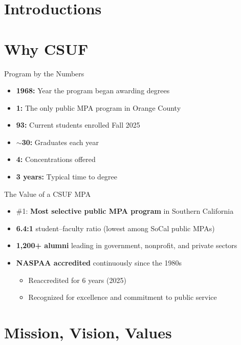 \documentclass[10pt]{beamer}
\begin{document}
\section{\textcolor{titanorange}{Introductions}}

\section{\textcolor{titanorange}{Why CSUF}}
\begin{frame}{Program by the Numbers}
\begin{Large}
\begin{itemize}
  \item \textbf{1968:} Year the program began awarding degrees
  \item \textbf{1:} The only public MPA program in Orange County
  \item \textbf{93:} Current students enrolled Fall 2025
  \item \textbf{\(\sim\)30:} Graduates each year
  \item \textbf{4:} Concentrations offered
  \item \textbf{3 years:} Typical time to degree
\end{itemize}
\end{Large}
\end{frame}

\begin{frame}{The Value of a CSUF MPA}
\begin{Large}
\begin{itemize}
  \item \#1: \textbf{Most selective public MPA program} in Southern California
  \item \textbf{6.4:1} student--faculty ratio (lowest among SoCal public MPAs)
  \item \textbf{1,200+ alumni} leading in government, nonprofit, and private sectors
  \item \textbf{NASPAA accredited} continuously since the 1980s
    \begin{itemize}
      \item Reaccredited for 6 years (2025)
      \item Recognized for excellence and commitment to public service
    \end{itemize}
\end{itemize}
\end{Large}
\end{frame}

\section{\textcolor{titanorange}{Mission, Vision, Values}}
\end{document}
